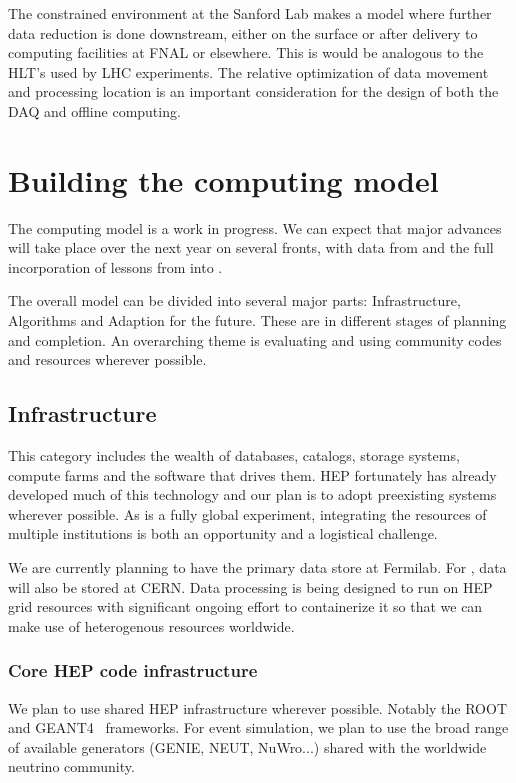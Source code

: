 The constrained environment at the Sanford Lab makes a model where further data reduction is done downstream, either on the surface or after delivery to computing facilities at FNAL or elsewhere. This is would be analogous to the HLT's used by LHC experiments. The relative optimization of data movement and processing location is an important consideration for the design of both the DAQ and offline computing.




\section{Building the computing model}\label{sw:bld-cmp-mdl}

The   computing model is a work in progress.  We can expect that major advances will take place over the next year on several fronts, with data from  and the full incorporation of lessons from   into  . 


The overall model can be divided into several major parts:  Infrastructure, Algorithms and Adaption for the future.  These are in different stages of planning and completion.  An overarching theme is evaluating and using community codes and resources wherever possible. 



\subsection{Infrastructure}
This category includes the wealth of databases, catalogs, storage systems, compute farms and the software that drives them.  HEP fortunately has already developed much of this technology and our plan is to adopt preexisting systems wherever possible.  As   is a fully global experiment, integrating the resources of multiple institutions is both an opportunity and a logistical challenge.

We are currently planning to have the primary data store at Fermilab.  For , data will also be stored at CERN.  Data processing is being designed to run on HEP grid resources with significant ongoing effort to containerize it so that we can make use of heterogenous resources worldwide. 


\subsubsection{Core HEP code infrastructure}
We plan to use shared HEP infrastructure wherever possible.  Notably the ROOT\cite{root} and GEANT4~\cite{geant4,Allison:2006ve} frameworks.   For event simulation, we plan to use the broad range of available generators (GENIE, NEUT, NuWro...) shared with the worldwide neutrino community.

